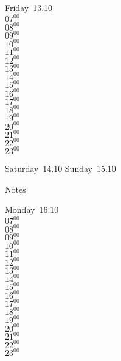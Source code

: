 \documentclass[11pt, a4paper]{book}\usepackage[]{graphicx}\usepackage[]{color}
\begin{document}
\begin{weekdaybox}
  Friday~13.10\\
  { 
  \vfill
  $07^{00}$\\
$08^{00}$\\
$09^{00}$\\
$10^{00}$\\
$11^{00}$\\
$12^{00}$\\
$13^{00}$\\
$14^{00}$\\
$15^{00}$\\
$16^{00}$\\
$17^{00}$\\
$18^{00}$\\
$19^{00}$\\
$20^{00}$\\
$21^{00}$\\
$22^{00}$\\
$23^{00}$\\
  }
\end{weekdaybox}
\begin{weekendbox}
  Saturday~14.10
  \tcblower
  Sunday~15.10
\end{weekendbox} %
\begin{notebox}
  Notes
\end{notebox}
\clearpage
\begin{headerbox}
\end{headerbox}
\begin{weekdaybox}
  Monday~16.10\\
  { 
  \vfill
  $07^{00}$\\
$08^{00}$\\
$09^{00}$\\
$10^{00}$\\
$11^{00}$\\
$12^{00}$\\
$13^{00}$\\
$14^{00}$\\
$15^{00}$\\
$16^{00}$\\
$17^{00}$\\
$18^{00}$\\
$19^{00}$\\
$20^{00}$\\
$21^{00}$\\
$22^{00}$\\
$23^{00}$\\
  }
\end{weekdaybox}
\end{document}
